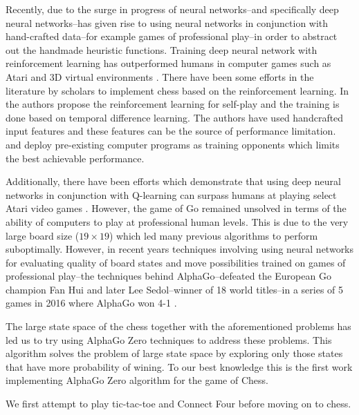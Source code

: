 \documentclass[english]{article}
\begin{document}
Recently, due to the surge in progress of neural networks--and
specifically deep neural networks--has given rise to using neural networks in
conjunction with hand-crafted data--for example games of professional play--in
order to abstract out the handmade heuristic functions.
Training deep neural network with reinforcement learning has outperformed
humans in computer games such as Atari and 3D virtual environments
\cite{eight, nine, ten}. There have been some efforts in the literature by
scholars to implement chess based on the reinforcement learning. In
\cite{one, two, three} the authors propose the reinforcement learning for
self-play and the training is done based on temporal difference learning.
The authors have used handcrafted input features and these features
can be the source of performance limitation. \cite{one} and \cite{two} deploy pre-existing
computer programs as training opponents which limits the best achievable
performance.

Additionally, there have been efforts which demonstrate that using deep neural
networks in conjunction with Q-learning can surpass humans at playing select
Atari video games \cite{DQN}. However, the game of Go remained unsolved in terms
of the ability of computers to play at professional human levels. This is due
to the very large board size ($19 \times 19$) which led many previous algorithms
to perform suboptimally. However, in recent years techniques involving using
neural networks for evaluating quality of board states and move possibilities
trained on games of professional play--the techniques behind AlphaGo--defeated the
European Go champion Fan Hui and later Lee Sedol--winner of 18 world titles--in a series
of 5 games in 2016 where AlphaGo won 4-1 \cite{AlphaGo, deepmind}.

The large state space of the chess together with the
aforementioned problems has led us to try using AlphaGo Zero techniques
to address these problems. This algorithm solves the problem
of large state space by exploring only those states that have more
probability of wining. To our best knowledge this is the first work
implementing AlphaGo Zero algorithm for the game of Chess.

We first attempt to play tic-tac-toe and Connect Four before moving on to chess.
\end{document}
